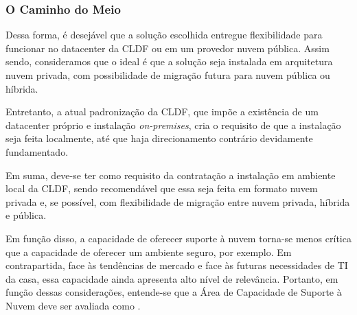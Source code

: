     \subsubsection*{O Caminho do Meio}

    Dessa forma, é desejável que a solução escolhida entregue flexibilidade para funcionar no datacenter da CLDF ou em um provedor nuvem pública. Assim sendo, consideramos que o ideal é que a solução seja instalada em arquitetura nuvem privada, com possibilidade de migração futura para nuvem pública ou híbrida.
    
    Entretanto, a atual padronização da CLDF, que impõe a existência de um datacenter próprio e instalação \emph{on-premises}, cria o requisito de que a instalação seja feita localmente, até que haja direcionamento contrário devidamente fundamentado.

    Em suma, deve-se ter como requisito da contratação a instalação em ambiente local da CLDF, sendo recomendável que essa seja feita em formato nuvem privada e, se possível, com flexibilidade de migração entre nuvem privada, híbrida e pública.
    
    Em função disso, a capacidade de oferecer suporte à nuvem torna-se menos crítica que a capacidade de oferecer um ambiente seguro, por exemplo. Em contrapartida, face às tendências de mercado e face às futuras necessidades de TI da casa, essa capacidade ainda apresenta alto nível de relevância. Portanto, em função dessas considerações, entende-se que a Área de Capacidade de Suporte à Nuvem deve ser avaliada como \SHOULD.